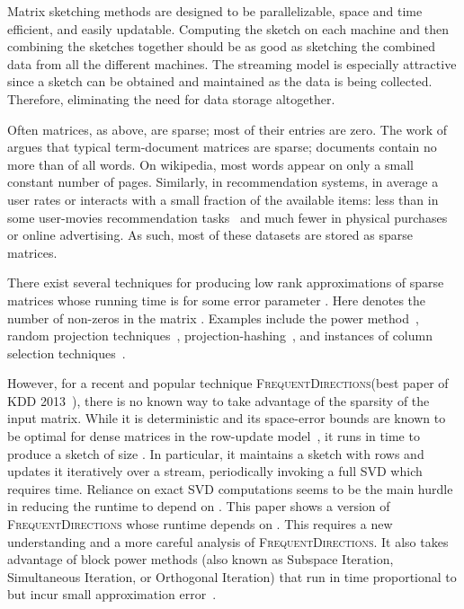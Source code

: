 \documentclass[11pt]{article}
\newcommand{\fd}{\textsc{FrequentDirections}\xspace}
\begin{document}
Matrix sketching methods are designed to be parallelizable, space and time efficient, and easily updatable.  
Computing the sketch on each machine and then combining the sketches together should be as good as sketching the combined data from all the different machines.
The streaming model is especially attractive since a sketch can be obtained and maintained as the data is being collected.
Therefore, eliminating the need for data storage altogether.

Often matrices, as above, are sparse;  most of their entries are zero. 
The work of \cite{dhillon2001concept} argues that typical term-document matrices are sparse; documents contain no more than  of all words.  
On wikipedia, most words appear on only a small constant number of pages.    
Similarly, in recommendation systems, in average a user rates or interacts with a small fraction of the available items:  
less than  in some user-movies recommendation tasks~\cite{asendorfalgorithms} and much fewer in physical purchases or online advertising.
As such, most of these datasets are stored as sparse matrices.  


There exist several techniques for producing low rank approximations of sparse matrices whose running time is 
 for some error parameter . 
Here  denotes the number of non-zeros in the matrix .
Examples include the power method~\cite{golub2012matrix}, random projection techniques~\cite{sarlos2006improved}, projection-hashing~\cite{clarkson2013low}, and instances of column selection techniques~\cite{drineas2006fast2}. 

However, for a recent and popular technique \fd (best paper of KDD 2013~\cite{liberty2013simple}), 
there is no known way to take advantage of the sparsity of the input matrix.  
While it is deterministic and its space-error bounds are known to be optimal for dense matrices in the row-update model~\cite{ghashami2015frequent}, it runs in  time to produce a sketch of size .  
In particular, it maintains a sketch with  rows and updates it iteratively over a stream, periodically invoking a full SVD which requires  time.  
Reliance on exact SVD computations seems to be the main hurdle in reducing the runtime to depend on .  
This paper shows a version of \fd whose runtime depends on . This requires a new understanding and a more careful analysis of \fd.  
It also takes advantage of block power methods (also known as Subspace Iteration, Simultaneous Iteration, or Orthogonal Iteration) that run in time proportional to  but incur small approximation error~\cite{musco2015stronger}.  
\end{document}
